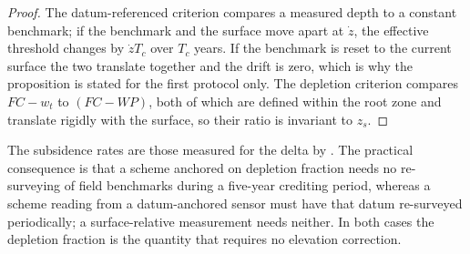 \begin{proof}
The datum-referenced criterion compares a measured depth to a constant benchmark;
if the benchmark and the surface move apart at $\dot z$, the effective threshold
changes by $\dot z T_c$ over $T_c$ years. If the benchmark is reset to the current
surface the two translate together and the drift is zero, which is why the
proposition is stated for the first protocol only. The depletion criterion compares
$FC-w_t$ to $(FC-WP)$, both of which are defined within the root zone and
translate rigidly with the surface, so their ratio is invariant to $z_s$.
\end{proof}

The subsidence rates are those measured for the delta by
\cite{minderhoud2017}. The practical consequence is that a scheme anchored on
depletion fraction needs no re-surveying of field benchmarks during a five-year
crediting period, whereas a scheme reading from a datum-anchored sensor must have that datum re-surveyed
periodically; a surface-relative measurement needs neither. In both cases the
depletion fraction is the quantity that requires no elevation correction.
